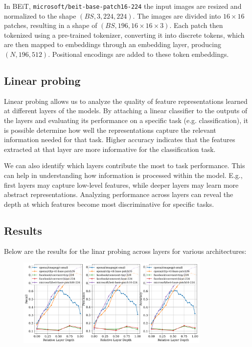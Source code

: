 \documentclass[
  11pt,
  a4paper,
  onecolumn]{article}
\begin{document}
In BEiT, \texttt{microsoft/beit-base-patch16-224} the input images are resized and normalized to the shape $(BS, 3, 224, 224)$. The images are divided into $16 \times 16$ patches, resulting in a shape of $(BS, 196, 16 \times 16 \times 3)$. Each patch then tokenized using a pre-trained tokenizer, converting it into discrete tokens, which are then mapped to embeddings through an embedding layer, producing $(N, 196, 512)$. Positional encodings are added to these token embeddings.


\subsection{Linear probing}
Linear probing allows us to analyze the quality of feature representations learned at different layers of the models. By attaching a linear classifier to the outputs of the layers and evaluating its performance on a specific task (e.g. classification), it is possible determine how well the representations capture the relevant information needed for that task. Higher accuracy indicates that the features extracted at that layer are more informative for the classification task.

We can also identify which layers contribute the most to task performance. This can help in understanding how information is processed within the model. E.g., first layers may capture low-level features, while deeper layers may learn more abstract representations. Analyzing performance across layers can reveal the depth at which features become most discriminative for specific tasks.

\subsection{Results}

Below are the results for the linar probing across layers for various architectures:
\begin{figure}[h!]
\centering
\includegraphics[width=0.85\textwidth]{figures/probing_plots.png}
\end{figure}
\end{document}
